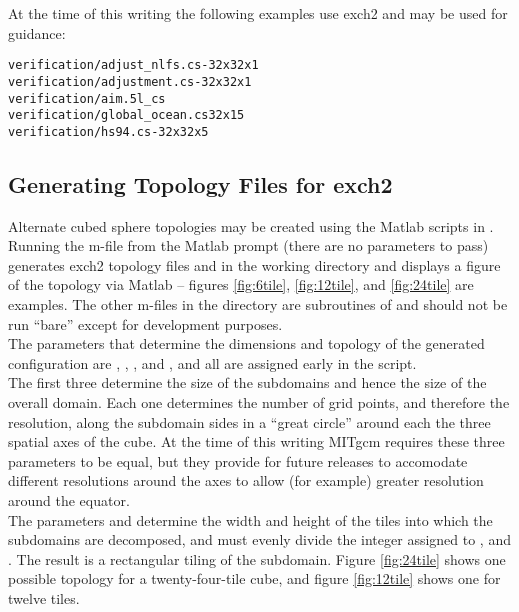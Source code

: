 At the time of this writing the following examples use exch2 and may
be used for guidance:

\begin{verbatim}
verification/adjust_nlfs.cs-32x32x1
verification/adjustment.cs-32x32x1 
verification/aim.5l_cs
verification/global_ocean.cs32x15
verification/hs94.cs-32x32x5
\end{verbatim}




\subsection{Generating Topology Files for exch2}
\label{sec:topogen}

Alternate cubed sphere topologies may be created using the Matlab
scripts in . Running the
m-file
from the Matlab prompt (there are no parameters to pass) generates
exch2 topology files  and
 in the working directory and displays a figure of
the topology via Matlab -- figures \ref{fig:6tile}, \ref{fig:12tile}, 
and \ref{fig:24tile} are examples.  The other m-files in the directory are
subroutines of  and should not be run ``bare'' except
for development purposes. \\

The parameters that determine the dimensions and topology of the
generated configuration are , , ,
 and , and all are assigned early in the script. \\

The first three determine the size of the subdomains and
hence the size of the overall domain.  Each one determines the number
of grid points, and therefore the resolution, along the subdomain
sides in a ``great circle'' around each the three spatial axes of the cube.  At the time
of this writing MITgcm requires these three parameters to be equal,
but they provide for future releases  to accomodate different
resolutions around the axes to allow (for example) greater resolution
around the equator.\\

The parameters  and  determine the width and height of
the tiles into which the subdomains are decomposed, and must evenly
divide the integer assigned to ,  and .
The result is a rectangular tiling of the subdomain.  Figure
\ref{fig:24tile} shows one possible topology for a twenty-four-tile
cube, and figure \ref{fig:12tile} shows one for twelve tiles. \\

